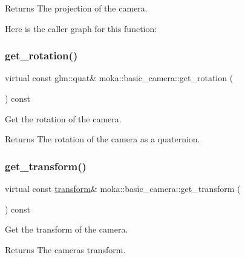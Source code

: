 \begin{DoxyReturn}{Returns}
The projection of the camera. 
\end{DoxyReturn}
Here is the caller graph for this function\+:
\mbox{\label{classmoka_1_1basic__camera_a1222bd9104d5dbd03964a4a340d08b06}} 
\subsubsection{\texorpdfstring{get\_rotation()}{get\_rotation()}}
{\footnotesize\ttfamily virtual const glm\+::quat\& moka\+::basic\+\_\+camera\+::get\+\_\+rotation (\begin{DoxyParamCaption}{ }\end{DoxyParamCaption}) const\hspace{0.3cm}{\ttfamily [virtual]}}



Get the rotation of the camera. 

\begin{DoxyReturn}{Returns}
The rotation of the camera as a quaternion. 
\end{DoxyReturn}
\mbox{\label{classmoka_1_1basic__camera_a44867c4b5f360a4924350b66bdf387a9}} 
\subsubsection{\texorpdfstring{get\_transform()}{get\_transform()}}
{\footnotesize\ttfamily virtual const \mbox{\hyperlink{classmoka_1_1transform}{transform}}\& moka\+::basic\+\_\+camera\+::get\+\_\+transform (\begin{DoxyParamCaption}{ }\end{DoxyParamCaption}) const\hspace{0.3cm}{\ttfamily [virtual]}}



Get the transform of the camera. 

\begin{DoxyReturn}{Returns}
The camera\textquotesingle{}s transform. 
\end{DoxyReturn}
\mbox{\label{classmoka_1_1basic__camera_a50d26f0db9969b36b29103e8a743d4c6}} 
